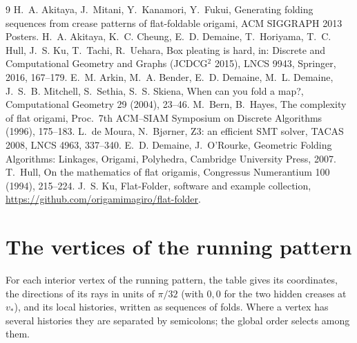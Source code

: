 \documentclass[11pt]{article}
\theoremstyle{definition}
\theoremstyle{remark}
\newcommand{\vstar}{v_\ast}
\begin{document}
\begin{thebibliography}{9}
 H.~A. Akitaya, J.~Mitani, Y.~Kanamori, Y.~Fukui, Generating folding sequences from crease patterns of flat-foldable origami, ACM SIGGRAPH 2013 Posters.
 H.~A. Akitaya, K.~C. Cheung, E.~D. Demaine, T.~Horiyama, T.~C. Hull, J.~S. Ku, T.~Tachi, R.~Uehara, Box pleating is hard, in: Discrete and Computational Geometry and Graphs (JCDCG$^2$ 2015), LNCS 9943, Springer, 2016, 167--179.
 E.~M. Arkin, M.~A. Bender, E.~D. Demaine, M.~L. Demaine, J.~S.~B. Mitchell, S.~Sethia, S.~S. Skiena, When can you fold a map?, Computational Geometry 29 (2004), 23--46.
 M.~Bern, B.~Hayes, The complexity of flat origami, Proc.\ 7th ACM--SIAM Symposium on Discrete Algorithms (1996), 175--183.
 L.~de Moura, N.~Bj{\o}rner, Z3: an efficient SMT solver, TACAS 2008, LNCS 4963, 337--340.
 E.~D. Demaine, J.~O'Rourke, Geometric Folding Algorithms: Linkages, Origami, Polyhedra, Cambridge University Press, 2007.
 T.~Hull, On the mathematics of flat origamis, Congressus Numerantium 100 (1994), 215--224.
 J.~S. Ku, Flat-Folder, software and example collection, \url{https://github.com/origamimagiro/flat-folder}.
\end{thebibliography}

\appendix
\section{The vertices of the running pattern}\label{app:table}

For each interior vertex of the running pattern, the table gives its coordinates, the directions of its rays in units of $\pi/32$ (with $0,0$ for the two hidden creases at $\vstar$), and its local histories, written as sequences of folds. Where a vertex has several histories they are separated by semicolons; the global order selects among them.
\end{document}
